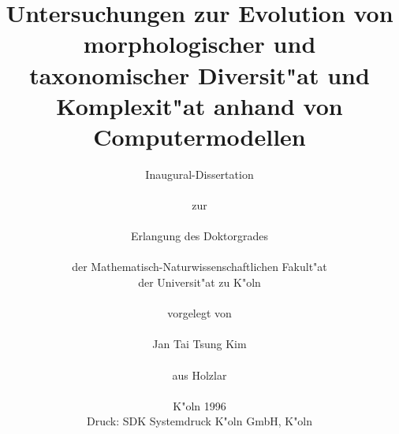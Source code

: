 \documentclass[12pt, a4paper, fleqn]{book}
\begin{document}
\title{\textbf{Untersuchungen zur Evolution von morphologischer und taxonomischer Diversit"at
und Komplexit"at anhand von Computermodellen}}

\author{Inaugural-Dissertation \\
\vspace*{0.2cm} \\
zur \\
\vspace*{0.2cm} \\
Erlangung des Doktorgrades \\
\vspace*{0.2cm} \\
der Mathematisch-Naturwissenschaftlichen Fakult"at \\
der Universit"at zu K"oln \\
\vspace*{1.3cm} \\
vorgelegt von \\
\vspace*{0.3cm} \\
{\Large Jan Tai Tsung Kim} \\
\vspace*{0.2cm} \\
aus Holzlar \\
\vspace*{1cm} \\
K"oln 1996
\vspace*{0.4cm} \\
{\footnotesize Druck: SDK Systemdruck K"oln GmbH, K"oln}}
\date{}
\maketitle
\end{document}
